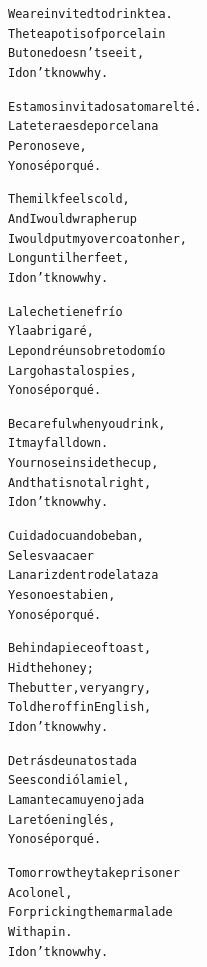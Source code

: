 \documentclass[11pt]{article}
\begin{document}
\begin{parcolumns}{2}

\colchunk
{
\begin{alltt}\normalfont
We are invited to drink tea.
The teapot is of porcelain
But one doesn’t see it,
I don’t know why.
\end{alltt}
}

\colchunk
{
\begin{alltt}\normalfont
Estamos invitados a tomar el té.
La tetera es de porcelana
Pero no se ve,
Yo no sé por qué.
\end{alltt}
}

\colplacechunks

\colchunk
{
\begin{alltt}\normalfont
The milk feels cold,
And I would wrap her up
I would put my overcoat on her,
Long until her feet,
I don’t know why.
\end{alltt}
}

\colchunk
{
\begin{alltt}\normalfont
La leche tiene frío
Y la abrigaré,
Le pondré un sobretodo mío
Largo hasta los pies,
Yo no sé por qué.
\end{alltt}
}

\colplacechunks

\colchunk
{
\begin{alltt}\normalfont
Be careful when you drink,
It may fall down.
Your nose inside the cup,
And that is not alright,
I don’t know why.
\end{alltt}
}

\colchunk
{
\begin{alltt}\normalfont
Cuidado cuando beban,
Se les va a caer
La nariz dentro de la taza
Y eso no esta bien,
Yo no sé por qué.
\end{alltt}
}

\colplacechunks

\colchunk
{
\begin{alltt}\normalfont
Behind a piece of toast,
Hid the honey;
The butter, very angry,
Told her off in English,
I don’t know why.
\end{alltt}
}

\colchunk
{
\begin{alltt}\normalfont
Detrás de una tostada
Se escondió la miel,
La manteca muy enojada
La retó en inglés,
Yo no sé por qué.
\end{alltt}
}

\colplacechunks

\colchunk
{
\begin{alltt}\normalfont
Tomorrow they take prisoner
A colonel,
For pricking the marmalade
With a pin.
I don’t know why.
\end{alltt}
}


\end{parcolumns}
\end{document}
